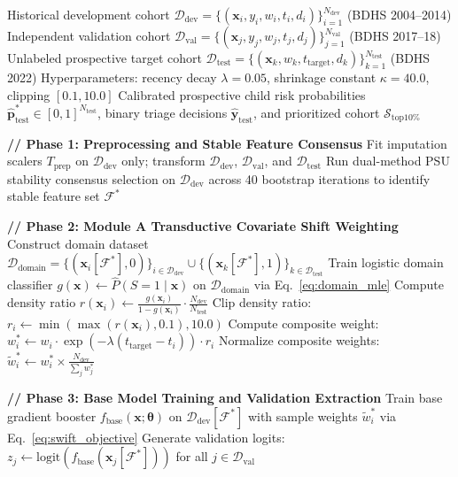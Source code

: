 \documentclass[a4paper,fleqn]{cas-sc}
\begin{document}
\begin{algorithm}[!htbp]
\small
\caption{Complete SWIFT-U5 Training, Calibration, and Prospective Evaluation Workflow}
\label{alg:swift}
\begin{algorithmic}[1]
\Require Historical development cohort $\mathcal{D}_{\text{dev}} = \{(\mathbf{x}_i, y_i, w_i, t_i, d_i)\}_{i=1}^{N_{\text{dev}}}$ (BDHS 2004--2014)
\Require Independent validation cohort $\mathcal{D}_{\text{val}} = \{(\mathbf{x}_j, y_j, w_j, t_j, d_j)\}_{j=1}^{N_{\text{val}}}$ (BDHS 2017--18)
\Require Unlabeled prospective target cohort $\mathcal{D}_{\text{test}} = \{(\mathbf{x}_k, w_k, t_{\text{target}}, d_k)\}_{k=1}^{N_{\text{test}}}$ (BDHS 2022)
\Require Hyperparameters: recency decay $\lambda = 0.05$, shrinkage constant $\kappa = 40.0$, clipping $[0.1, 10.0]$
\Ensure Calibrated prospective child risk probabilities $\hat{\mathbf{p}}_{\text{test}}^* \in [0, 1]^{N_{\text{test}}}$, binary triage decisions $\hat{\mathbf{y}}_{\text{test}}$, and prioritized cohort $\mathcal{S}_{\text{top10\%}}$

\Statex \textbf{// Phase 1: Preprocessing and Stable Feature Consensus}
\State Fit imputation scalers $T_{\text{prep}}$ on $\mathcal{D}_{\text{dev}}$ only; transform $\mathcal{D}_{\text{dev}}$, $\mathcal{D}_{\text{val}}$, and $\mathcal{D}_{\text{test}}$
\State Run dual-method PSU stability consensus selection on $\mathcal{D}_{\text{dev}}$ across 40 bootstrap iterations to identify stable feature set $\mathcal{F}^*$

\Statex \textbf{// Phase 2: Module A Transductive Covariate Shift Weighting}
\State Construct domain dataset $\mathcal{D}_{\text{domain}} = \{(\mathbf{x}_i[\mathcal{F}^*], 0)\}_{i \in \mathcal{D}_{\text{dev}}} \cup \{(\mathbf{x}_k[\mathcal{F}^*], 1)\}_{k \in \mathcal{D}_{\text{test}}}$
\State Train logistic domain classifier $g(\mathbf{x}) \gets \hat{P}(S=1 \mid \mathbf{x})$ on $\mathcal{D}_{\text{domain}}$ via Eq.~\eqref{eq:domain_mle}
    \State Compute density ratio $r(\mathbf{x}_i) \gets \frac{g(\mathbf{x}_i)}{1 - g(\mathbf{x}_i)} \cdot \frac{N_{\text{dev}}}{N_{\text{test}}}$
    \State Clip density ratio: $r_i \gets \min(\max(r(\mathbf{x}_i), 0.1), 10.0)$
    \State Compute composite weight: $w_i^* \gets w_i \cdot \exp(-\lambda(t_{\text{target}} - t_i)) \cdot r_i$
\EndFor
\State Normalize composite weights: $\tilde{w}_i^* \gets w_i^* \times \frac{N_{\text{dev}}}{\sum_{j} w_j^*}$

\Statex \textbf{// Phase 3: Base Model Training and Validation Extraction}
\State Train base gradient booster $f_{\text{base}}(\mathbf{x}; \boldsymbol{\theta})$ on $\mathcal{D}_{\text{dev}}[\mathcal{F}^*]$ with sample weights $\tilde{w}_i^*$ via Eq.~\eqref{eq:swift_objective}
\State Generate validation logits: $z_j \gets \text{logit}(f_{\text{base}}(\mathbf{x}_j[\mathcal{F}^*]))$ for all $j \in \mathcal{D}_{\text{val}}$


\end{algorithmic}
\end{algorithm}
\end{document}
